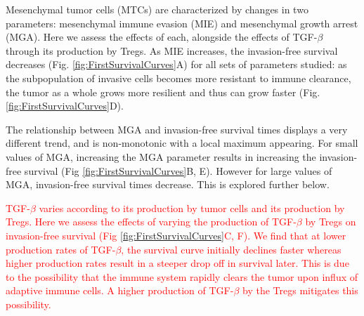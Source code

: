 \documentclass[11pt]{article}
\newcommand{\tcr} { \textcolor{red} }
\begin{document}
Mesenchymal tumor cells (MTCs) are characterized by changes in two parameters: mesenchymal immune evasion (MIE) and mesenchymal growth arrest (MGA). Here we assess the effects of each, alongside the effects of TGF-$\beta$ through its production by Tregs.  
As MIE increases, the invasion-free survival decreases (Fig. \ref{fig:FirstSurvivalCurves}A) for all sets of parameters studied: as the subpopulation of invasive cells becomes more resistant to immune clearance, the tumor as a whole grows more resilient and thus can grow faster (Fig. \ref{fig:FirstSurvivalCurves}D).
\par
The relationship between MGA and invasion-free survival times displays a very different trend, and is non-monotonic with a local maximum appearing. For small values of MGA, increasing the MGA parameter results in increasing the invasion-free survival (Fig \ref{fig:FirstSurvivalCurves}B, E). However for large values of MGA, invasion-free survival times decrease. This is explored further below.
\par
\tcr{
TGF-$\beta$ varies according to its production by tumor cells and its production by Tregs. Here we assess the effects of varying the production of  TGF-$\beta$ by Tregs on invasion-free survival (Fig \ref{fig:FirstSurvivalCurves}C, F). We find that at lower production rates of TGF-$\beta$, the survival curve initially declines faster whereas higher production rates result in a steeper drop off in survival later. This is due to the possibility that the immune system rapidly clears the tumor upon influx of adaptive immune cells. A higher production of TGF-$\beta$ by the Tregs mitigates this possibility.
}
\end{document}
